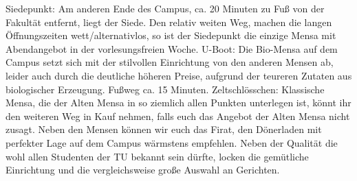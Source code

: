Siedepunkt: Am anderen Ende des Campus,  ca. 20 Minuten zu Fuß von der Fakultät entfernt, liegt der Siede. Den relativ weiten Weg, machen die langen Öffnungszeiten wett/alternativlos, so ist der Siedepunkt die einzige Mensa mit Abendangebot in der vorlesungsfreien Woche.
U-Boot: Die Bio-Mensa auf dem Campus setzt sich mit der stilvollen Einrichtung von den anderen Mensen ab, leider auch durch die deutliche höheren Preise, aufgrund der teureren Zutaten aus biologischer Erzeugung. Fußweg ca. 15 Minuten.
Zeltschlösschen: Klassische Mensa, die der Alten Mensa in so ziemlich allen Punkten unterlegen ist, könnt ihr den weiteren Weg in Kauf nehmen, falls euch das Angebot der Alten Mensa nicht zusagt. 
Neben den Mensen können wir euch das Firat, den Dönerladen mit perfekter Lage auf dem Campus wärmstens empfehlen.  Neben der Qualität die wohl allen Studenten der TU bekannt sein dürfte, locken die gemütliche Einrichtung und die vergleichsweise  große Auswahl an Gerichten.
